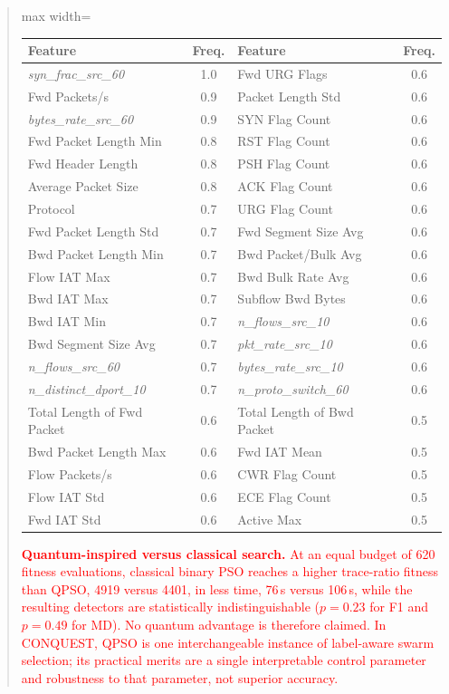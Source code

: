 \documentclass[11pt]{article}
\newenvironment{excerpt}{\begin{quote}\sloppy}{\end{quote}}
\begin{document}
\begin{excerpt}
\begin{table}[H]
\color{black}
\setlength{\tabcolsep}{2.5pt}
\renewcommand{\arraystretch}{1.02}
\begin{adjustbox}{max width=\linewidth}
\begin{tabular}{>{\raggedright\arraybackslash}p{3.0cm}c >{\raggedright\arraybackslash}p{3.0cm}c}
\hline\toprule
Feature & Freq. & Feature & Freq. \\
\hline\toprule
\textit{syn\_frac\_src\_60} & 1.0 & Fwd URG Flags & 0.6 \\
Fwd Packets/\allowbreak s & 0.9 & Packet Length Std & 0.6 \\
\textit{bytes\_rate\_src\_60} & 0.9 & SYN Flag Count & 0.6 \\
Fwd Packet Length Min & 0.8 & RST Flag Count & 0.6 \\
Fwd Header Length & 0.8 & PSH Flag Count & 0.6 \\
Average Packet Size & 0.8 & ACK Flag Count & 0.6 \\
Protocol & 0.7 & URG Flag Count & 0.6 \\
Fwd Packet Length Std & 0.7 & Fwd Segment Size Avg & 0.6 \\
Bwd Packet Length Min & 0.7 & Bwd Packet/\allowbreak Bulk Avg & 0.6 \\
Flow IAT Max & 0.7 & Bwd Bulk Rate Avg & 0.6 \\
Bwd IAT Max & 0.7 & Subflow Bwd Bytes & 0.6 \\
Bwd IAT Min & 0.7 & \textit{n\_flows\_src\_10} & 0.6 \\
Bwd Segment Size Avg & 0.7 & \textit{pkt\_rate\_src\_10} & 0.6 \\
\textit{n\_flows\_src\_60} & 0.7 & \textit{bytes\_rate\_src\_10} & 0.6 \\
\textit{n\_distinct\_dport\_10} & 0.7 & \textit{n\_proto\_switch\_60} & 0.6 \\
Total Length of Fwd Packet & 0.6 & Total Length of Bwd Packet & 0.5 \\
Bwd Packet Length Max & 0.6 & Fwd IAT Mean & 0.5 \\
Flow Packets/\allowbreak s & 0.6 & CWR Flag Count & 0.5 \\
Flow IAT Std & 0.6 & ECE Flag Count & 0.5 \\
Fwd IAT Std & 0.6 & Active Max & 0.5 \\
\hline\toprule
\end{tabular}
\end{adjustbox}
\end{table}

\textcolor{red}{\textbf{Quantum-inspired versus classical
search.} At an equal budget of 620 fitness evaluations, classical
binary PSO reaches a higher trace-ratio fitness than QPSO, 4919
versus 4401, in less time, 76\,s versus 106\,s, while the resulting
detectors are statistically indistinguishable ($p=0.23$ for F1 and
$p=0.49$ for MD). No quantum advantage is therefore claimed. In
CONQUEST, QPSO is one interchangeable instance of label-aware swarm
selection; its practical merits are a single interpretable control
parameter and robustness to that parameter, not superior accuracy.}
\end{excerpt}
\end{document}

